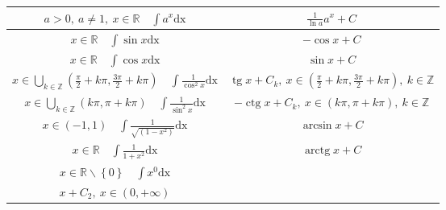 \documentclass{article}
\DeclareMathOperator{\tg}{tg}
\DeclareMathOperator{\ctg}{ctg}
\DeclareMathOperator{\arctg}{arctg}
\begin{document}
\begin{tabular}{ |c|c| }
    $\displaystyle a > 0,\ a\neq 1,\ x \in \mathbb{R} \quad \int a^x \text{dx}$                                                                      & $ \displaystyle\frac{1}{\ln a} a^x + C$                                                            \\ \hline
    $\displaystyle x \in \mathbb{R} \quad \int \sin x \text{dx}$                                                                                     & $ \displaystyle-\cos x + C$                                                                        \\ \hline
    $\displaystyle x \in \mathbb{R} \quad \int \cos x \text{dx}$                                                                                     & $ \displaystyle\sin x + C$                                                                         \\ \hline
    $\displaystyle x \in \bigcup_{k \in \mathbb{Z}} \left(\frac{\pi}{2} + k\pi, \frac{3\pi}{2} + k\pi\right)\quad \int \frac{1}{\cos^2 x} \text{dx}$ & $ \tg x + C_k,\ x \in \left(\frac{\pi}{2} + k\pi, \frac{3\pi}{2} + k\pi\right),\ k \in \mathbb{Z}$ \\ \hline
    $\displaystyle x \in \bigcup_{k \in \mathbb{Z}} \left(k\pi, \pi + k\pi\right)\quad \int \frac{1}{\sin^2 x} \text{dx}$                            & $ \displaystyle-\ctg x + C_k,\ x \in \left(k\pi, \pi + k\pi\right),\ k \in \mathbb{Z}$             \\ \hline
    $\displaystyle x \in \left(-1, 1\right) \quad \int \frac{1}{\sqrt{\left(1 - x^2\right)}} \text{dx}                      $                        & $ \arcsin x + C$                                                                                   \\ \hline
    $\displaystyle x \in \mathbb{R} \quad \int \frac{1}{1+x^2} \text{dx}$                                                                            & $ \arctg x + C$                                                                                    \\ \hline
    $\displaystyle x \in \mathbb{R}\backslash \left\{0\right\} \quad \int x^{0} \text{dx}$                                                           &
    \makecell{
    $x + C_1,\ x \in \left(-\infty, 0\right)$                                                                                                                                                                                                             \\
        $x + C_2,\ x \in \left(0, +\infty\right)$
    }                                                                                                                                                                                                                                                     \\ \hline
\end{tabular}
\end{document}
